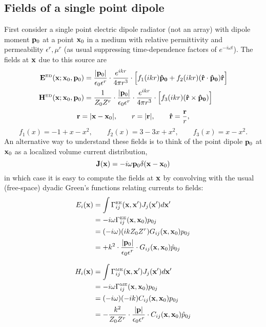 \documentclass[letterpaper]{article}
\begin{document}
\subsection*{Fields of a single point dipole}

First consider a single point electric dipole radiator (not an array)
with dipole moment $\mathbf{p}_0$ at a point $\mathbf{x}_0$ in a
medium with relative permittivity and permeability
$\epsilon^r, \mu^r$
(as usual suppressing time-dependence factors
of $e^{-i\omega t}$). The fields at $\mathbf{x}$ due to this source are 
\begin{align*}
  \mathbf{E}^{\hbox{\tiny{ED}}}(\mathbf{x}; \mathbf{x}_0, \mathbf{p}_0)
   &= \frac{|\mathbf{p}_0|}{\epsilon_0 \epsilon^r}
      \cdot \frac{e^{ikr}}{4\pi r^3} \cdot 
      \Big[ f_1(ikr) \mathbf{\hat p_0} + f_2(ikr)(\mathbf{\hat r}\cdot \mathbf{\hat p_0})\mathbf{\hat r} \Big]
\\
  \mathbf{H}^{\hbox{\tiny{ED}}}(\mathbf{x}; \mathbf{x}_0, \mathbf{p}_0)
   &= \frac{1}{Z_0 Z^r }\cdot \frac{|\mathbf{p}_0|}{\epsilon_0 \epsilon^r}
      \cdot \frac{e^{ikr}}{4\pi r^3} \cdot 
      \Big[ f_3(ikr) (\mathbf{\hat r}\times\mathbf{\hat p_0})\Big]
\end{align*}
$$ \mathbf{r}=|\mathbf{x}-\mathbf{x}_0|, \qquad r=|\mathbf{r}|, \qquad \mathbf{\hat r}=\frac{\mathbf{r}}{r},$$
$$ f_1(x)=-1+x-x^2, \qquad f_2(x)=3-3x+x^2, \qquad f_3(x)=x-x^2.$$
An alternative way to understand these fields is to think of the point dipole
$\mathbf{p}_0$ at $\mathbf{x}_0$ as a localized volume current distribution, 
$$ \mathbf{J}(\mathbf{x}) = -i\omega \mathbf{p}_0 \delta(\mathbf{x}-\mathbf{x}_0) $$
in which case it is easy to compute the fields at $\mathbf{x}$ by
convolving with the usual (free-space) dyadic
Green's functions relating currents to fields:
\begin{subequations}
\begin{align}
 E_i(\mathbf{x}) 
&= 
 \int \Gamma_{ij}^{\hbox{\tiny{EE}}}(\mathbf{x}, \mathbf{x}^\prime) J_j(\mathbf{x}^\prime) d\mathbf{x}^\prime
\nonumber \\
&=-i\omega \Gamma_{ij}^{\hbox{\tiny{EE}}}(\mathbf{x}, \mathbf{x}_0) p_{0j}
\nonumber \\
&=(-i\omega)(ikZ_0Z^r) G_{ij}(\mathbf{x}, \mathbf{x}_0) p_{0j}
\nonumber \\
&=+k^2 \cdot \frac{|\mathbf{p}_0|}{\epsilon_0 \epsilon^r } \cdot G_{ij}(\mathbf{x}, \mathbf{x}_0) \hat{p}_{0j}
\\[8pt]
H_i(\mathbf{x}) 
 &=
\int \Gamma_{ij}^{\hbox{\tiny{ME}}}(\mathbf{x}, \mathbf{x}^\prime) J_j(\mathbf{x}^\prime) d\mathbf{x}^\prime
\nonumber \\
&=-i\omega \Gamma_{ij}^{\hbox{\tiny{ME}}}(\mathbf{x}, \mathbf{x}_0) p_{0j}
\nonumber \\
&=(-i\omega)(-ik)  C_{ij}(\mathbf{x}, \mathbf{x}_0) p_{0j}
\nonumber \\
&=-\frac{k^2}{Z_0 Z^r} 
   \cdot 
   \frac{|\mathbf{p}|}{\epsilon_0 \epsilon^r}
   \cdot C_{ij}(\mathbf{x}, \mathbf{x}_0) \hat{p}_{0j}
\end{align}
\label{DipoleFieldsFromGC}
\end{subequations}
\end{document}
